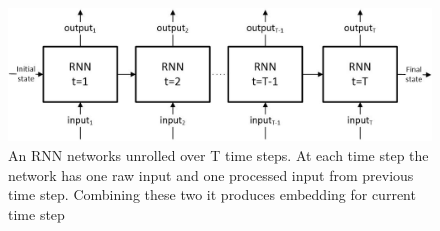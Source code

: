 \documentclass[10pt,twocolumn,letterpaper]{article}
\begin{document}
\begin{figure}[h]
	\begin{center}
		\includegraphics[width=\linewidth]{rnn_network2}
	\end{center}
	\caption{An RNN networks unrolled over T time steps. At each time step the network has one raw input and one processed input from previous time step. Combining these two it produces embedding for current time step}
	\label{fig:rnn_network}
\end{figure}
 

\end{document}
